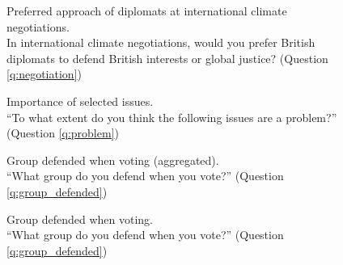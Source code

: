 \documentclass[12pt,english]{article}
\begin{document}
\begin{figure}[h!]
    \caption[Preferred approach for international climate negotiations]{Preferred approach of diplomats at international climate negotiations. \\ In international climate negotiations, would you prefer British diplomats to defend British interests or global justice? (Question \ref{q:negotiation})}\label{fig:negotiation}
\end{figure}

\begin{figure}[h!]
    \caption[Importance of selected issues]{Importance of selected issues.\\ ``To what extent do you think the following issues are a problem?'' (Question \ref{q:problem})}\label{fig:problem}
\end{figure}

\begin{figure}[h!]
    \caption[Group defended when voting (aggregated)]{Group defended when voting (aggregated). \\ ``What group do you defend when you vote?'' (Question \ref{q:group_defended})}\label{fig:group_defended}
\end{figure}

\begin{figure}[h!]
    \caption[Group defended when voting]{Group defended when voting. \\ ``What group do you defend when you vote?'' (Question \ref{q:group_defended})}\label{fig:group_defended}
\end{figure}
\end{document}
